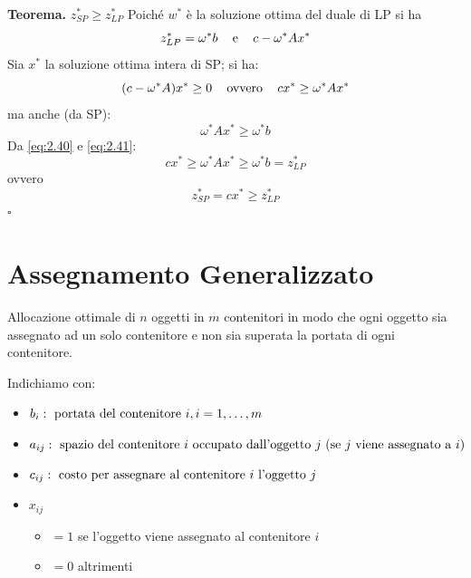 \textbf{Teorema.} $z_{SP}^{*}\ge z_{LP}^{*}$
Poiché $w^{*}$ è la soluzione ottima del duale di LP si ha
\begin{equation}
	z_{LP}^{*}=\omega^{*}b\;\;\;\textnormal{ e }\;\;\;c-\omega^{*}Ax^{*}
\end{equation}
Sia $x^{*}$ la soluzione ottima intera di SP; si ha:
\begin{equation}
	\label{eq:2.40}
	(c-\omega^{*}A)x^{*}\ge 0\;\;\;\textnormal{ ovvero }\;\;\;cx^{*}\ge \omega^{*}Ax^{*} 
\end{equation}
ma anche (da SP):
\begin{equation}
	\label{eq:2.41}
	\omega^{*}Ax^{*}\ge\omega^{*}b
\end{equation}
Da \ref{eq:2.40} e \ref{eq:2.41}:
\begin{equation}
	cx^{*}\ge \omega^{*}Ax^{*}\ge\omega^{*}b=z^{*}_{LP}
\end{equation}
ovvero
\begin{equation}
	z^{*}_{SP}=cx^{*}\ge z_{LP}^{*}
\end{equation}
$\square$

\section{Assegnamento Generalizzato}
Allocazione ottimale di $n$ oggetti in $m$ contenitori in modo che ogni oggetto sia assegnato ad un solo contenitore e non sia superata la portata di ogni contenitore.

Indichiamo con:
\begin{itemize}
	\item[] $b_{i}: \textnormal{ portata del contenitore }i,i=1,\dots,m$
	\item[] $a_{ij}: \textnormal{ spazio del contenitore $i$ occupato dall'oggetto $j$ (se $j$ viene assegnato a $i$)}$
	\item[] $c_{ij}: \textnormal{ costo per assegnare al contenitore $i$ l'oggetto $j$}$
	\item[] $x_{ij}$ 
	\begin{itemize}
		\item[] $=1$ se l'oggetto viene assegnato al contenitore $i$
		\item[] $=0$ altrimenti
	\end{itemize}
\end{itemize}

